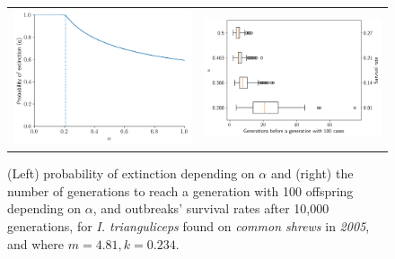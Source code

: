 \documentclass{article}
\begin{document}
\begin{figure}[]
	\begin{mdframed}[backgroundcolor=grey250,rightline=false,leftline=false,topline=false]
		\centering
		\begin{tabular}{ll}
			\includegraphics[width=.46\linewidth,valign=m]{extinctionProbability2005_I. trianguliceps_SA} & \includegraphics[width=.50\linewidth,valign=m]{firstGeneration100_2005_I. trianguliceps_SA}
		\end{tabular}
		\caption{(Left) probability of extinction depending on $ \alpha $ and (right) the number of generations to reach a generation with 100 offspring depending on $ \alpha $, and  outbreaks' survival rates after 10,000 generations, for \textit{I. trianguliceps} found on \textit{common shrews} in \textit{2005}, and where $ m = 4.81, k = 0.234 $.}
		\label{fig:simulation_2005_itrianguliceps_SA}
	\end{mdframed}
\end{figure}
\end{document}
